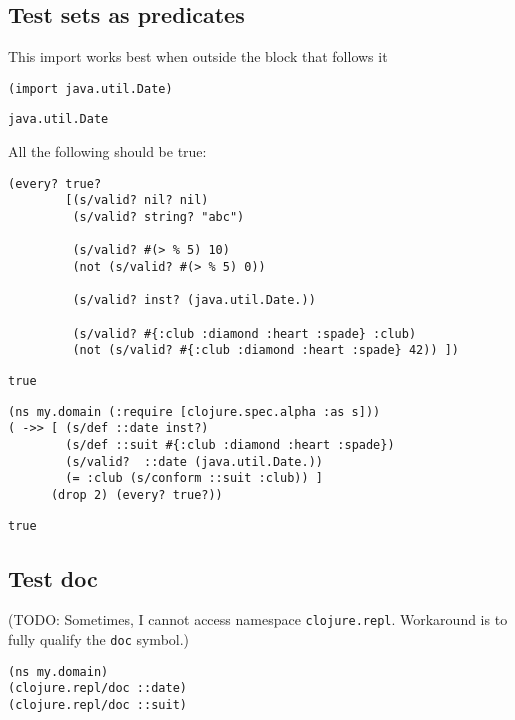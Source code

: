\documentclass[10pt,oneside,x11names]{article}
\begin{document}
\subsection{Test sets as predicates}
\label{sec:org0baa7d6}

This import works best when outside the block that follows it

\begin{verbatim}
(import java.util.Date)
\end{verbatim}

\begin{verbatim}
java.util.Date
\end{verbatim}


All the following should be true:

\begin{verbatim}
(every? true?
        [(s/valid? nil? nil)
         (s/valid? string? "abc")

         (s/valid? #(> % 5) 10)
         (not (s/valid? #(> % 5) 0))

         (s/valid? inst? (java.util.Date.))

         (s/valid? #{:club :diamond :heart :spade} :club)
         (not (s/valid? #{:club :diamond :heart :spade} 42)) ])
\end{verbatim}

\begin{verbatim}
true
\end{verbatim}


\begin{verbatim}
(ns my.domain (:require [clojure.spec.alpha :as s]))
( ->> [ (s/def ::date inst?)
        (s/def ::suit #{:club :diamond :heart :spade})
        (s/valid?  ::date (java.util.Date.))
        (= :club (s/conform ::suit :club)) ]
      (drop 2) (every? true?))
\end{verbatim}

\begin{verbatim}
true
\end{verbatim}

\subsection{Test doc}
\label{sec:orgd23464d}

(TODO: Sometimes, I cannot access namespace \texttt{clojure.repl}. Workaround is to
fully qualify the \texttt{doc} symbol.)

\begin{verbatim}
(ns my.domain)
(clojure.repl/doc ::date)
(clojure.repl/doc ::suit)
\end{verbatim}
\end{document}
